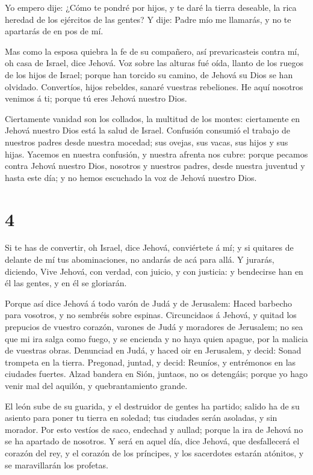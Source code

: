 Yo empero dije: ¿Cómo te pondré por hijos, y te daré la
tierra deseable, la rica heredad de los ejércitos de las gentes? Y dije:
Padre mío me llamarás, y no te apartarás de en pos de mí.

 Mas como la esposa quiebra la fe de su compañero, así
prevaricasteis contra mí, oh casa de Israel, dice Jehová. 
Voz sobre las alturas fué oída, llanto de los ruegos de los hijos de
Israel; porque han torcido su camino, de Jehová su Dios se han olvidado.
 Convertíos, hijos rebeldes, sanaré vuestras rebeliones. He
aquí nosotros venimos á ti; porque tú eres Jehová nuestro Dios.

 Ciertamente vanidad son los collados, la multitud de los
montes: ciertamente en Jehová nuestro Dios está la salud de Israel.
 Confusión consumió el trabajo de nuestros padres desde
nuestra mocedad; sus ovejas, sus vacas, sus hijos y sus hijas.
 Yacemos en nuestra confusión, y nuestra afrenta nos cubre:
porque pecamos contra Jehová nuestro Dios, nosotros y nuestros padres,
desde nuestra juventud y hasta este día; y no hemos escuchado la voz de
Jehová nuestro Dios.

\hypertarget{section-3}{%
\section{4}\label{section-3}}

 Si te has de convertir, oh Israel, dice Jehová, conviértete
á mí; y si quitares de delante de mí tus abominaciones, no andarás de
acá para allá.  Y jurarás, diciendo, Vive Jehová, con
verdad, con juicio, y con justicia: y bendecirse han en él las gentes, y
en él se gloriarán.

 Porque así dice Jehová á todo varón de Judá y de Jerusalem:
Haced barbecho para vosotros, y no sembréis sobre espinas. 
Circuncidaos á Jehová, y quitad los prepucios de vuestro corazón,
varones de Judá y moradores de Jerusalem; no sea que mi ira salga como
fuego, y se encienda y no haya quien apague, por la malicia de vuestras
obras.  Denunciad en Judá, y haced oir en Jerusalem, y
decid: Sonad trompeta en la tierra. Pregonad, juntad, y decid: Reuníos,
y entrémonos en las ciudades fuertes.  Alzad bandera en
Sión, juntaos, no os detengáis; porque yo hago venir mal del aquilón, y
quebrantamiento grande.

 El león sube de su guarida, y el destruidor de gentes ha
partido; salido ha de su asiento para poner tu tierra en soledad; tus
ciudades serán asoladas, y sin morador.  Por esto vestíos de
saco, endechad y aullad; porque la ira de Jehová no se ha apartado de
nosotros.  Y será en aquel día, dice Jehová, que
desfallecerá el corazón del rey, y el corazón de los príncipes, y los
sacerdotes estarán atónitos, y se maravillarán los profetas.

